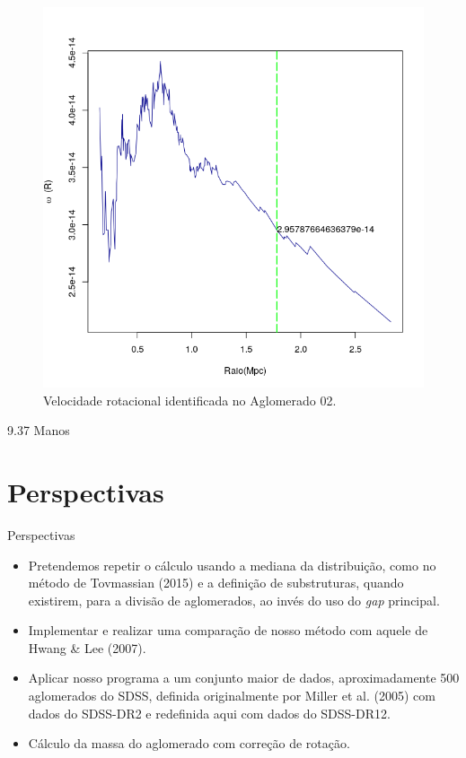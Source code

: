 \documentclass[xcolor=dvipsnames,10pt]{beamer}
\begin{document}
\begin{frame}
	 \begin{figure}[!htbp] %
  \vspace{-2pt}
  \begin{center}
    \includegraphics[scale=.8]{resultados/rotacao.png}
    \caption{Velocidade rotacional identificada no Aglomerado 02.}
    \label{rotate}%
  \end{center}
  \end{figure}
  \begin{center}
  	9.37 Manos
  \end{center}
\end{frame}

\section{Perspectivas}
\begin{frame}{Perspectivas}
  \begin{itemize}
    \item Pretendemos repetir o cálculo usando a mediana da distribuição, como no método de Tovmassian (2015) e a definição de substruturas, quando existirem, para a divisão de aglomerados, ao invés do uso do {\it gap} principal.
    \item Implementar e realizar uma comparação de nosso método com aquele de Hwang \& Lee (2007).
    \item Aplicar nosso programa a um conjunto maior de dados, aproximadamente 500 aglomerados do SDSS, definida originalmente por Miller et al. (2005) com dados do SDSS-DR2 e redefinida aqui com dados do SDSS-DR12.
    \item Cálculo da massa do aglomerado com correção de rotação.
  \end{itemize}
\end{frame}
\end{document}
